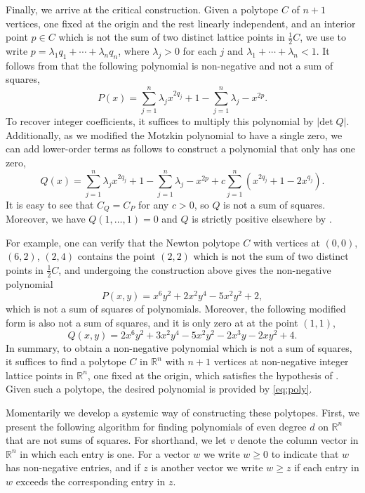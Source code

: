 \documentclass[oneside,hidelinks,indentfirst,10pt]{book}
\begin{document}
Finally, we arrive at the critical construction. Given a polytope \(C\) of \(n+1\) vertices, one fixed at the origin and the rest linearly independent, and an interior point \(p\in C\) which is not the sum of two distinct lattice points in \(\frac{1}{2}C\), we use  to write \(p=\lambda_1q_1+\cdots+\lambda_nq_n\), where \(\lambda_j>0\) for each \(j\) and \(\lambda_1+\cdots+\lambda_n<1\). It follows from  that the following polynomial is non-negative and not a sum of squares,
\begin{equation}\label{eq:shortone}
    P(x)=\sum_{j=1}^n\lambda_jx^{2q_j}+1-\sum_{j=1}^n\lambda_j-x^{2p}.
\end{equation}
To recover integer coefficients, it suffices to multiply this polynomial by \(|\mathrm{det}\;Q|\). Additionally, as we modified the Motzkin polynomial to have a single zero, we can add lower-order terms as follows to construct a polynomial that only has one zero,
\begin{equation}\label{eq:poly}
    Q(x)=\sum_{j=1}^n\lambda_jx^{2q_j}+1-\sum_{j=1}^n\lambda_j-x^{2p}+c\sum_{j=1}^n(x^{2q_j}+1-2x^{q_j}).
\end{equation}
It is easy to see that \(C_Q=C_P\) for any \(c>0\), so \(Q\) is not a sum of squares. Moreover, we have \(Q(1,\dots,1)=0\) and \(Q\) is strictly positive elsewhere by .


For example, one can verify that the Newton polytope \(C\) with vertices at \((0,0)\), \((6,2)\), \((2,4)\) contains the point \((2,2)\) which is not the sum of two distinct points in \(\frac{1}{2}C\), and undergoing the construction above gives the non-negative polynomial
\[
    P(x,y)=x^6y^2+2x^2y^4-5x^2y^2+2,
\]
which is not a sum of squares of polynomials. Moreover, the following modified form is also not a sum of squares, and it is only zero at at the point \((1,1)\),
\[
    Q(x,y)=2 x^6 y^2+3 x^2 y^4-5 x^2 y^2-2 x^3 y-2 x y^2+4.
\]
In summary, to obtain a non-negative polynomial which is not a sum of squares, it suffices to find a polytope \(C\) in \(\mathbb{R}^n\) with \(n+1\) vertices at non-negative integer lattice points in \(\mathbb{R}^n\), one fixed at the origin, which satisfies the hypothesis of . Given such a polytope, the desired polynomial is provided by \eqref{eq:poly}.


Momentarily we develop a systemic way of constructing these polytopes. First, we present the following algorithm for finding polynomials of even degree \(d\) on \(\mathbb{R}^n\) that are not sums of squares. For shorthand, we let \(v\) denote the column vector in \(\mathbb{R}^n\) in which each entry is one. For a vector \(w\) we write \(w\geq0\) to indicate that \(w\) has non-negative entries, and if \(z\) is another vector we write \(w\geq z\) if each entry in \(w\) exceeds the corresponding entry in \(z\).
\end{document}
